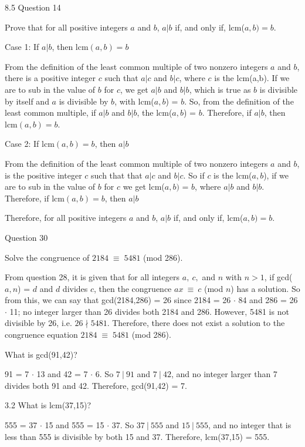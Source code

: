 \documentclass{article}
\author{Joshua Harthan}
\begin{document}
8.5 Question 14
\item[]Prove that for all positive integers $a$ and $b$, $a | b$ if, and only if, lcm($a,b) = b$.
\item[]Case 1: If $a | b$, then lcm$(a,b) = b$
\item[]From the definition of the least common multiple of two nonzero integers $a$ and $b$, there is a positive integer $c$ such that $a|c$ and $b|c$, where $c$ is the lcm(a,b). If we are to sub in the value of $b$ for $c$, we get $a|b$ and $b|b$, which is true as $b$ is divisible by itself and $a$ is divisible by $b$, with lcm($a,b$) = $b$. So, from the definition of the least common multiple, if $a|b$ and $b|b$, the lcm($a,b$) = $b$. Therefore, if $a|b$, then lcm$(a,b) = b$.

\item[]Case 2: If lcm$(a,b) = b$, then $a|b$
\item[]From the definition of the least common multiple of two nonzero integers $a$ and $b$, is the positive integer $c$ such that 
that $a|c$ and $b|c$. So if $c$ is the lcm($a,b$), if we are to sub in the value of $b$ for $c$ we get lcm($a,b)$ = $b$, where $a|b$ and $b|b$. Therefore, if lcm$(a,b) = b$, then $a|b$

Therefore, for all positive integers $a$ and $b$, $a | b$ if, and only if, lcm($a,b) = b$.

\clearpage
{} Question 30
\item[]Solve the congruence of $2184 \; \equiv \; 5481$ (mod 286).
\item[]From question 28, it is given that for all integers $a, \: c,$ and $n$ with $n > 1$, if gcd($a,n$) = $d$ and $d$ divides $c$, then the congruence $ax \: \equiv \: c$ (mod $n$) has a solution. So from this, we can say that gcd(2184,286) = 26 since 2184 = 26 $\cdot$ 84 and 286 = 26 $\cdot$ 11; no integer larger than 26 divides both 2184 and 286. However, 5481 is not divisible by 26, i.e. $26 \nmid 5481$. Therefore, there does not exist a solution to the congruence equation $2184 \; \equiv \; 5481$ (mod 286).


\clearpage
{} What is gcd(91,42)?
\item[] 91 = 7 $ \cdot $ 13 and 42 = 7 $ \cdot $ 6. So $7 \: | \: 91$ and $7 \: | \: 42$, and no integer larger than 7 divides both 91 and 42. Therefore, gcd(91,42) = 7.
\item[]3.2 What is lcm(37,15)? 
\item[] 555 = 37 $ \cdot $ 15 and 555 = 15 $ \cdot $ 37. So $37 \: | \: 555$ and $15 \: | \: 555$, and no integer that is less than 555 is divisible by both 15 and 37. Therefore, lcm(37,15) = 555. 
\end{document}
